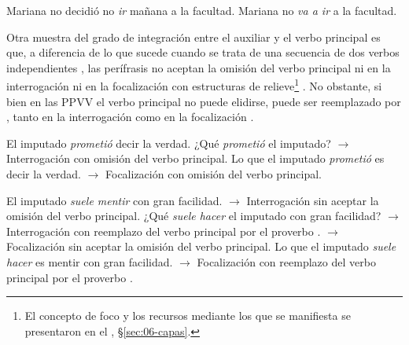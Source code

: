 \begin{exe}
  \ex
    \begin{xlist}
      \ex\label{ex:11-neg-a} Mariana no decidió no \textit{ir} mañana a la
          facultad.
      \ex Mariana no \textit{va a ir} a la facultad.
    \end{xlist}
\end{exe}

Otra muestra del grado de integración entre el auxiliar y el verbo principal es
que, a diferencia de lo que sucede cuando se trata de una secuencia de dos verbos
independientes , las perífrasis no aceptan la omisión del
verbo principal ni en la interrogación  ni en la
focalización con estructuras de relieve\footnote{El concepto de foco y los
recursos mediante los que se manifiesta se presentaron en el ,
§\ref{sec:06-capas}.} . No obstante, si bien en las PPVV el
verbo principal no puede elidirse, puede ser reemplazado por , tanto
en la interrogación  como en la focalización
.

\begin{exe}
  \ex\label{ex:11-imputado}
    \begin{xlist}
      \ex El imputado \textit{prometió} decir la verdad.
      \ex ¿Qué \textit{prometió} el imputado? $\rightarrow$ Interrogación con
          omisión del verbo principal.
      \ex Lo que el imputado \textit{prometió} es decir la verdad. $\rightarrow$
          Focalización con omisión del verbo principal.
    \end{xlist}
  \ex\label{ex:11-suele}
    \begin{xlist}
      \ex El imputado \textit{suele mentir} con gran facilidad.
       $\rightarrow$ Interrogación sin aceptar la omisión del verbo
          principal.
      \ex\label{ex:11-suele-c} ¿Qué \textit{suele hacer} el imputado con gran
          facilidad? $\rightarrow$ Interrogación con reemplazo del verbo principal
          por el proverbo .
       $\rightarrow$ Focalización sin aceptar la omisión del
          verbo principal.
      \ex\label{ex:11-suele-e} Lo que el imputado \textit{suele hacer} es mentir
          con gran facilidad. $\rightarrow$ Focalización con reemplazo del verbo
          principal por el proverbo .
    \end{xlist}
\end{exe}

